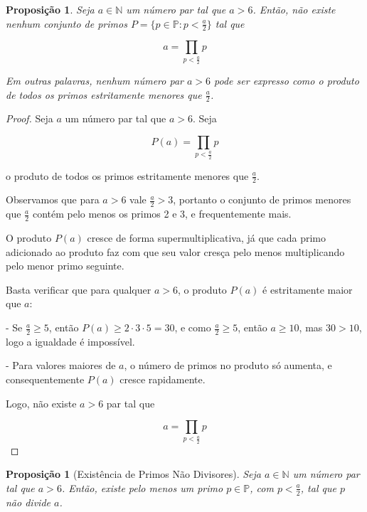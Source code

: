 \documentclass[a4paper,11pt]{article}
\newtheorem{proposition}[theorem]{Proposição}
\theoremstyle{definition}
\theoremstyle{remark}
\begin{document}
\begin{otherlanguage}{brazil}
	
	\begin{proposition}\label{prop: produto_p_menores_a_meio}
		Seja \(a \in \mathbb{N}\) um número par tal que \(a > 6\). Então, não existe nenhum conjunto de primos \(P = \{p \in \mathbb{P} : p < \frac{a}{2}\}\) tal que
		
		\[
		a = \prod_{p < \frac{a}{2}} p
		\]
		
		Em outras palavras, nenhum número par \(a > 6\) pode ser expresso como o produto de todos os primos estritamente menores que \(\frac{a}{2}\).
	\end{proposition}
	
	\begin{proof}
		Seja \(a\) um número par tal que \(a > 6\). Seja
		
		\[
		P(a) = \prod_{p < \frac{a}{2}} p
		\]
		
		o produto de todos os primos estritamente menores que \(\frac{a}{2}\).
		
		Observamos que para \(a > 6\) vale \(\frac{a}{2} > 3\), portanto o conjunto de primos menores que \(\frac{a}{2}\) contém pelo menos os primos 2 e 3, e frequentemente mais.
		
		O produto \(P(a)\) cresce de forma supermultiplicativa, já que cada primo adicionado ao produto faz com que seu valor cresça pelo menos multiplicando pelo menor primo seguinte.
		
		Basta verificar que para qualquer \(a > 6\), o produto \(P(a)\) é estritamente maior que \(a\):
		
		- Se \(\frac{a}{2} \geq 5\), então \(P(a) \geq 2 \cdot 3 \cdot 5 = 30\), e como \(\frac{a}{2} \geq 5\), então \(a \geq 10\), mas \(30 > 10\), logo a igualdade é impossível.
		
		- Para valores maiores de \(a\), o número de primos no produto só aumenta, e consequentemente \(P(a)\) cresce rapidamente.
		
		Logo, não existe \(a > 6\) par tal que
		
		\[
		a = \prod_{p < \frac{a}{2}} p
		\]
		
	\end{proof}
	
	\begin{proposition}[Existência de Primos Não Divisores]\label{prop:existencia_de_primos_nao_divisores}
		Seja \(a \in \mathbb{N}\) um número par tal que \(a > 6\). Então, existe pelo menos um primo \(p \in \mathbb{P}\), com \(p < \frac{a}{2}\), tal que \(p\) não divide \(a\).
	\end{proposition}
	

\end{otherlanguage}
\end{document}
